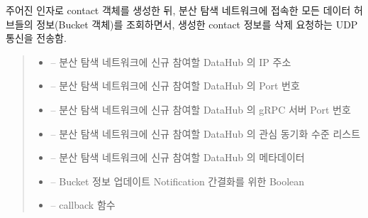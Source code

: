 \documentclass[a4paper,10pt,english]{sphinxmanual}
\begin{document}
\begin{fulllineitems}

\begin{fulllineitems}
\label{\detokenize{_kademlia:KNode.delete}}
\pysigstartsignatures
{}
\pysigstopsignatures
\sphinxAtStartPar
주어진 인자로 contact 객체를 생성한 뒤,
분산 탐색 네트워크에 접속한 모든 데이터 허브들의 정보(Bucket 객체)를 조회하면서,
생성한 contact 정보를 삭제 요청하는 UDP 통신을 전송함.
\begin{quote}\begin{description}
\begin{itemize}
\item {} 
\sphinxAtStartPar
{} – 분산 탐색 네트워크에 신규 참여할 DataHub 의 IP 주소

\item {} 
\sphinxAtStartPar
{} – 분산 탐색 네트워크에 신규 참여할 DataHub 의 Port 번호

\item {} 
\sphinxAtStartPar
{} – 분산 탐색 네트워크에 신규 참여할 DataHub 의 {\hyperref[\detokenize{_SessionListener:sessionlistener}]{}} gRPC 서버 Port 번호

\item {} 
\sphinxAtStartPar
{} – 분산 탐색 네트워크에 신규 참여할 DataHub 의 관심 동기화 수준 리스트

\item {} 
\sphinxAtStartPar
{} – 분산 탐색 네트워크에 신규 참여할 DataHub 의 메타데이터

\item {} 
\sphinxAtStartPar
{} – Bucket 정보 업데이트 Notification 간결화를 위한 Boolean

\item {} 
\sphinxAtStartPar
{} – callback 함수


\end{itemize}
\end{description}
\end{quote}
\end{fulllineitems}
\end{fulllineitems}
\end{document}
